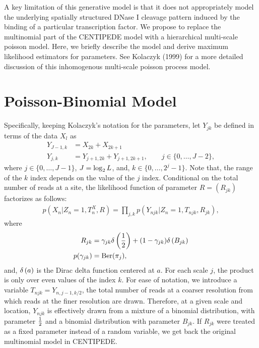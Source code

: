 \documentclass[reqno]{amsart}
\numberwithin{equation}{section}
\begin{document}
A key limitation of this generative model is that it does not appropriately model the underlying spatially 
structured DNase I cleavage pattern induced by the binding of a particular transcription factor. 
We propose to replace the multinomial part of the CENTIPEDE model with a hierarchical multi-scale poisson model. 
Here, we briefly describe the model and derive maximum likelihood estimators for parameters. 
See Kolaczyk (1999) for a more detailed discussion of this inhomogenous multi-scale poisson process model. 

\section{Poisson-Binomial Model}
Specifically, keeping Kolaczyk's notation for the parameters, let $Y_{jk}$ be defined in terms of the data $X_l$ as
\begin{align}
    Y_{J-1,k} &= X_{2k}+X_{2k+1} \\
    Y_{j,k} &= Y_{j+1,2k}+Y_{j+1,2k+1}, \qquad j \in \{0,\ldots,J-2\},
\end{align}
where $j \in \{0,\ldots,J-1\}$, $J=\log_2{L}$, and, $k \in \{0,\ldots,2^{j}-1\}$. Note that, the
range of the $k$ index depends on the value of the $j$ index. Conditional on the total number of reads 
at a site, the likelihood function of parameter $R = (R_{jk})$ factorizes as follows:
\begin{align}
    p(X_n | Z_n=1, T^X_n, R) = \prod_{j,k} p(Y_{njk} | Z_n=1, T_{njk}, R_{jk}),
\end{align}
where
\begin{align}
    R_{jk} &= \gamma_{jk} \delta \left(\frac{1}{2} \right) + (1 - \gamma_{jk}) \delta \left(B_{jk} \right) \\
    p(\gamma_{jk}) &= \mathrm{Ber}(\pi_j), \\
\end{align}
and, $\delta \left(a \right)$ is the Dirac delta function centered at $a$. For each scale $j$, the product is only 
over even values of the index $k$. For ease of notation, we introduce a variable $T_{njk} = Y_{n,j-1,k/2}$, the 
total number of reads at a coarser resolution from which reads at the finer resolution are
drawn. Therefore, at a given scale and location, $Y_{njk}$ is effectively drawn from a mixture of
a binomial distribution, with parameter $\frac{1}{2}$ and a binomial distribution with parameter $B_{jk}$.
If $R_{jk}$ were treated as a fixed parameter instead of a random variable, we get back the
original multinomial model in CENTIPEDE.
\end{document}
